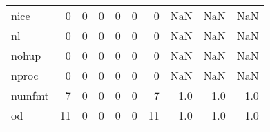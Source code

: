 \begin{longtable}{lrrrrrrrrr}
nice      &                                                  0 &                                                  0 &                                                  0 &                                                  0 &                                                  0 &                                                  0 &                                                NaN &                                    NaN &                                  NaN \\
nl        &                                                  0 &                                                  0 &                                                  0 &                                                  0 &                                                  0 &                                                  0 &                                                NaN &                                    NaN &                                  NaN \\
nohup     &                                                  0 &                                                  0 &                                                  0 &                                                  0 &                                                  0 &                                                  0 &                                                NaN &                                    NaN &                                  NaN \\
nproc     &                                                  0 &                                                  0 &                                                  0 &                                                  0 &                                                  0 &                                                  0 &                                                NaN &                                    NaN &                                  NaN \\
numfmt    &                                                  7 &                                                  0 &                                                  0 &                                                  0 &                                                  0 &                                                  7 &                                                1.0 &                                    1.0 &                                  1.0 \\
od        &                                                 11 &                                                  0 &                                                  0 &                                                  0 &                                                  0 &                                                 11 &                                                1.0 &                                    1.0 &                                  1.0 \\

\end{longtable}
